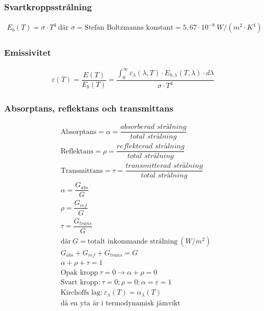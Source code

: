 \subsubsection*{Svartkroppsstrålning}
\begin{align*}
	E_b(T)=\sigma \cdot T^4 \
	\text{där } \sigma = \text{Stefan Boltzmanns konstant} = 5,67 \cdot 10^{-8} \ W/(m^2 \cdot K^4) 
\end{align*}
\subsubsection*{Emissivitet}
\begin{align*}
	\varepsilon(T)	= \dfrac{E(T)}{E_b(T)} = \dfrac{\int_{0}^\infty \varepsilon_\lambda(\lambda, T) \cdot E_{b,\lambda}(T,\lambda) \cdot d\lambda}{\sigma \cdot T^4}
\end{align*}
\subsubsection*{Absorptans, reflektans och transmittans}
\begin{align*}
	& \text{Absorptans} = \alpha = \dfrac{\textit{absorberad strålning}}{\textit{total strålning}} \\
	& \text{Reflektans} = \rho = \dfrac{\textit{reflekterad strålning}}{\textit{total strålning}} \\
	& \text{Transmittans} = \tau = \dfrac{\textit{transmitterad strålning}}{\textit{total strålning}} \\
	& \alpha = \dfrac{G_{abs}}{G} \\
	& \rho = \dfrac{G_{ref}}{G} \\
	& \tau = \dfrac{G_{trans}}{G} \\
	&	\text{där} \ G = \text{totalt inkommande strålning} \ (W/m^2) \\
	& G_{abs} + G_{ref} + G_{trans} = G \\
	& \alpha + \rho + \tau = 1 \\
	& \text{Opak kropp} \ \tau = 0 \rightarrow \alpha + \rho = 0 \\
	& \text{Svart kropp:} \ \tau=0; \rho = 0; \alpha = \varepsilon = 1 \\
	& \text{Kirchoffs lag:} \ \varepsilon_\lambda(T) = \alpha_\lambda(T) \\ &\text{då en yta är i termodynamisk jämvikt}
\end{align*}
